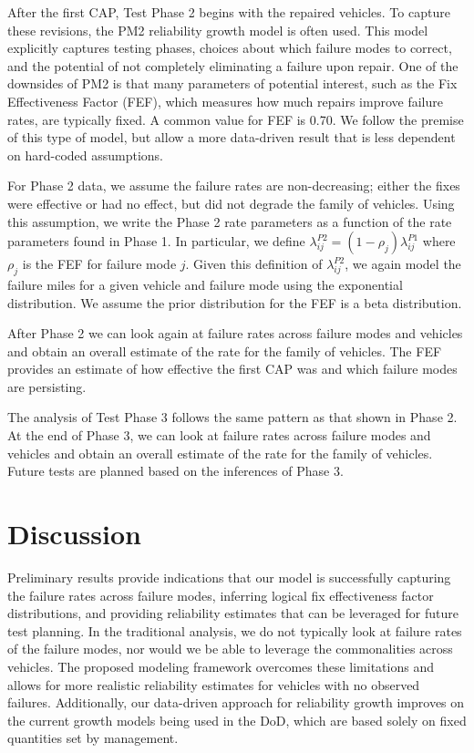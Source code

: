 \documentclass[12pt]{article}
\begin{document}
After the first CAP, Test Phase 2 begins with the repaired vehicles. To capture these revisions, the PM2 reliability growth model \cite{EH06} is often used. This model explicitly captures testing phases, choices about which failure modes to correct, and the potential of not completely eliminating a failure upon repair. One of the downsides of PM2 is that many parameters of potential interest, such as the Fix Effectiveness Factor (FEF), which measures how much repairs improve failure rates, are typically fixed. A common value for FEF is 0.70. We follow the premise of this type of model, but allow a more data-driven result that is less dependent on hard-coded assumptions.

For Phase 2 data, we assume the failure rates are non-decreasing; either the fixes were effective or had no effect, but did not degrade the family of vehicles. Using this assumption, we write the Phase 2 rate parameters as a function of the rate parameters found in Phase 1. In particular, we define $\lambda_{ij}^{P2}=(1-\rho_{j})\lambda_{ij}^{P1}$ where $\rho_{j}$ is the FEF for failure mode $j$. Given this definition of $\lambda_{ij}^{P2}$, we again model the failure miles for a given vehicle and failure mode using the exponential distribution. We assume the prior distribution for the FEF is a beta distribution.

After Phase 2 we can look again at failure rates across failure modes and vehicles and obtain an overall estimate of the rate for the family of vehicles. The FEF provides an estimate of how effective the first CAP was and which failure modes are persisting.

The analysis of Test Phase 3 follows the same pattern as that shown in Phase 2. At the end of Phase 3, we can look at failure rates across failure modes and vehicles and obtain an overall estimate of the rate for the family of vehicles. Future tests are planned based on the inferences of Phase 3.


\section{Discussion}
Preliminary results provide indications that our model is successfully capturing the failure rates across failure modes, inferring logical fix effectiveness factor distributions, and providing reliability estimates that can be leveraged for future test planning. In the traditional analysis, we do not typically look at failure rates of the failure modes, nor would we be able to leverage the commonalities across vehicles. The proposed modeling framework overcomes these limitations and allows for more realistic reliability estimates for vehicles with no observed failures. Additionally, our data-driven approach for reliability growth improves on the current growth models being used in the DoD, which are based solely on fixed quantities set by management.
\end{document}
